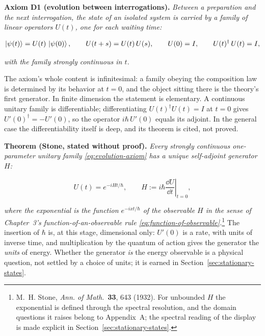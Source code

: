 \medskip\noindent\textbf{Axiom D1 (evolution between interrogations).} \emph{Between a preparation and the next interrogation, the state of an isolated system is carried by a family of linear operators $U(t)$, one for each waiting time:}
\begin{linenomath}
    \begin{equation}
        \ket{\psi(t)} = U(t)\,\ket{\psi(0)}, \qquad U(t+s) = U(t)\,U(s), \qquad U(0) = I, \qquad U(t)^\dagger\,U(t) = I,
        \label{eq:evolution-axiom}
    \end{equation}
\end{linenomath}
\emph{with the family strongly continuous in $t$.}

The axiom's whole content is infinitesimal: a family obeying the composition law is determined by its behavior at $t = 0$, and the object sitting there is the theory's first generator. In finite dimension the statement is elementary. A continuous unitary family is differentiable; differentiating $U(t)^\dagger U(t) = I$ at $t = 0$ gives $U'(0)^\dagger = -U'(0)$, so the operator $i\hbar\,U'(0)$ equals its adjoint. In the general case the differentiability itself is deep, and its theorem is cited, not proved.

\medskip\noindent\textbf{Theorem (Stone, stated without proof).} \emph{Every strongly continuous one-parameter unitary family \eqref{eq:evolution-axiom} has a unique self-adjoint generator $H$:}
\begin{linenomath}
    \begin{equation}
        U(t) = e^{-iHt/\hbar}, \qquad H := i\hbar\left.\frac{\dd U}{\dd t}\right|_{t=0},
        \label{eq:generator-def}
    \end{equation}
\end{linenomath}
\emph{where the exponential is the function $e^{-ixt/\hbar}$ of the observable $H$ in the sense of Chapter~3's function-of-an-observable rule \eqref{eq:function-of-observable}.}\footnote{M.~H. Stone, \emph{Ann. of Math.}~\textbf{33}, 643 (1932). For unbounded $H$ the exponential is defined through the spectral resolution, and the domain questions it raises belong to Appendix~A; the spectral reading of the display is made explicit in Section~\ref{sec:stationary-states}.} The insertion of $\hbar$ is, at this stage, dimensional only: $U'(0)$ is a rate, with units of inverse time, and multiplication by the quantum of action gives the generator the \emph{units} of energy. Whether the generator \emph{is} the energy observable is a physical question, not settled by a choice of units; it is earned in Section~\ref{sec:stationary-states}.

